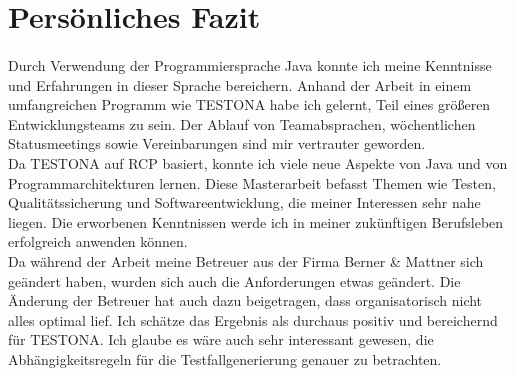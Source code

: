 \section{Persönliches Fazit}
\paragraph{}
Durch Verwendung der Programmiersprache Java konnte ich meine Kenntnisse und Erfahrungen in dieser Sprache bereichern. Anhand der Arbeit in einem umfangreichen Programm wie TESTONA habe ich gelernt, Teil eines größeren Entwicklungsteams zu sein. Der Ablauf von Teamabsprachen, wöchentlichen Statusmeetings sowie Vereinbarungen sind mir vertrauter geworden.\\


Da TESTONA auf RCP basiert, konnte ich viele neue Aspekte von Java und von Programm\-architekturen lernen. Diese Masterarbeit befasst Themen wie Testen, Qualitätssicherung und Softwareentwicklung, die meiner Interessen sehr nahe liegen. Die erworbenen Kenntnissen werde ich in meiner zukünftigen Berufsleben erfolgreich anwenden können.\\


Da während der Arbeit meine Betreuer aus der Firma Berner \& Mattner sich geändert haben, wurden sich auch die Anforderungen etwas geändert. Die Änderung der Betreuer hat auch dazu beigetragen, dass organisatorisch nicht alles optimal lief. Ich schätze das Ergebnis als durchaus positiv und bereichernd für TESTONA. Ich glaube es wäre auch sehr interessant gewesen, die Abhängigkeitsregeln für die Testfallgenerierung genauer zu betrachten.